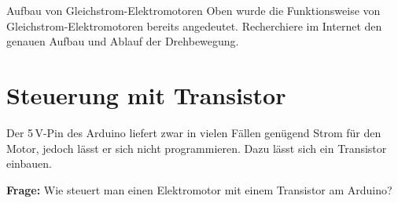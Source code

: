 \begin{recherche}{Aufbau von Gleichstrom-Elektromotoren}
	Oben wurde die Funktionsweise von Gleichstrom-Elektromotoren bereits angedeutet. Recherchiere im Internet den genauen Aufbau und Ablauf der Drehbewegung. 
\end{recherche}

\section{Steuerung mit Transistor}

Der 5\,V-Pin des Arduino liefert zwar in vielen Fällen genügend Strom für den Motor, jedoch lässt er sich nicht programmieren. Dazu lässt sich ein Transistor einbauen.

\begin{ziel}
	\textbf{Frage:} Wie steuert man einen Elektromotor mit einem Transistor am Arduino?
\end{ziel}


